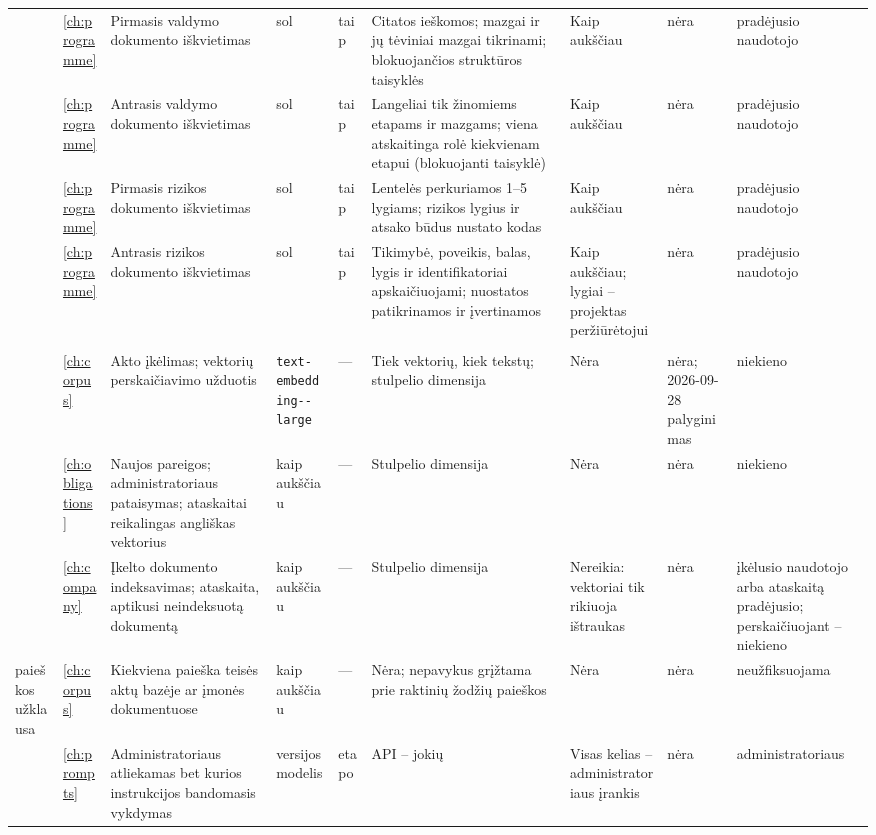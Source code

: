 \begin{landscape}
\begin{xltabular}{\linewidth}{@{}>{\scriptsize}L{31mm}>{\scriptsize}L{6mm}>{\scriptsize}L{36mm}>{\scriptsize}L{15mm}>{\scriptsize}L{9mm}>{\scriptsize}Y>{\scriptsize}L{38mm}>{\scriptsize}L{19mm}>{\scriptsize}L{25mm}@{}}
 & \ref{ch:programme} & Pirmasis valdymo dokumento iškvietimas & sol & taip & Citatos ieškomos; mazgai ir jų tėviniai mazgai tikrinami; blokuojančios struktūros taisyklės & Kaip aukščiau & nėra & pradėjusio naudotojo \\
 & \ref{ch:programme} & Antrasis valdymo dokumento iškvietimas & sol & taip & Langeliai tik žinomiems etapams ir mazgams; viena atskaitinga rolė kiekvienam etapui (blokuojanti taisyklė) & Kaip aukščiau & nėra & pradėjusio naudotojo \\
 & \ref{ch:programme} & Pirmasis rizikos dokumento iškvietimas & sol & taip & Lentelės perkuriamos 1--5 lygiams; rizikos lygius ir atsako būdus nustato kodas & Kaip aukščiau & nėra & pradėjusio naudotojo \\
 & \ref{ch:programme} & Antrasis rizikos dokumento iškvietimas & sol & taip & Tikimybė, poveikis, balas, lygis ir identifikatoriai apskaičiuojami; nuostatos patikrinamos ir įvertinamos & Kaip aukščiau; lygiai -- projektas peržiūrėtojui & nėra & pradėjusio naudotojo \\
\midrule
{} \\
 & \ref{ch:corpus} & Akto įkėlimas; vektorių perskaičiavimo užduotis & \texttt{text-\allowbreak embedding--large} & --- & Tiek vektorių, kiek tekstų; stulpelio dimensija & Nėra & nėra; 2026-09-28 palyginimas & niekieno \\
 & \ref{ch:obligations} & Naujos pareigos; administratoriaus pataisymas; ataskaitai reikalingas angliškas vektorius & kaip aukščiau & --- & Stulpelio dimensija & Nėra & nėra & niekieno \\
 & \ref{ch:company} & Įkelto dokumento indeksavimas; ataskaita, aptikusi neindeksuotą dokumentą & kaip aukščiau & --- & Stulpelio dimensija & Nereikia: vektoriai tik rikiuoja ištraukas & nėra & įkėlusio naudotojo arba ataskaitą pradėjusio; perskaičiuojant -- niekieno \\
paieškos užklausa & \ref{ch:corpus} & Kiekviena paieška teisės aktų bazėje ar įmonės dokumentuose & kaip aukščiau & --- & Nėra; nepavykus grįžtama prie raktinių žodžių paieškos & Nėra & nėra & neužfiksuojama \\
 & \ref{ch:prompts} & Administratoriaus atliekamas bet kurios instrukcijos bandomasis vykdymas & versijos modelis & etapo & API -- jokių & Visas kelias -- administratoriaus įrankis & nėra & administratoriaus \\
\end{xltabular}
\end{landscape}

